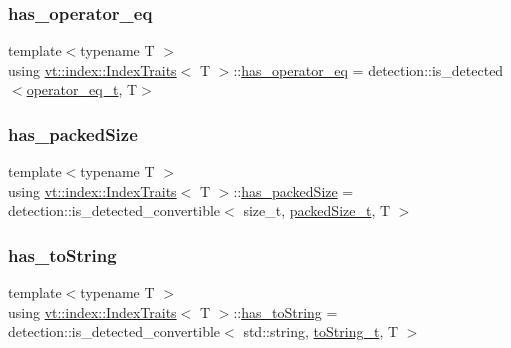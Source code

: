\subsubsection{\texorpdfstring{has\+\_\+operator\+\_\+eq}{has\_operator\_eq}}
{\footnotesize\ttfamily template$<$typename T $>$ \\
using \hyperlink{structvt_1_1index_1_1_index_traits}{vt\+::index\+::\+Index\+Traits}$<$ T $>$\+::\hyperlink{structvt_1_1index_1_1_index_traits_a93695cc99aee3cbdc63a3e2ab9b3f6be}{has\+\_\+operator\+\_\+eq} =  detection\+::is\+\_\+detected$<$\hyperlink{structvt_1_1index_1_1_index_traits_a23832f22385d2d20bb1fc9885aef6146}{operator\+\_\+eq\+\_\+t}, T$>$}

\mbox{\label{structvt_1_1index_1_1_index_traits_a257797ee702aa2108e9950f9aba373a4}} 
\subsubsection{\texorpdfstring{has\+\_\+packed\+Size}{has\_packedSize}}
{\footnotesize\ttfamily template$<$typename T $>$ \\
using \hyperlink{structvt_1_1index_1_1_index_traits}{vt\+::index\+::\+Index\+Traits}$<$ T $>$\+::\hyperlink{structvt_1_1index_1_1_index_traits_a257797ee702aa2108e9950f9aba373a4}{has\+\_\+packed\+Size} =  detection\+::is\+\_\+detected\+\_\+convertible$<$ size\+\_\+t, \hyperlink{structvt_1_1index_1_1_index_traits_a6d511f10a88cd9fb5b4d832127ce5044}{packed\+Size\+\_\+t}, T $>$}

\mbox{\label{structvt_1_1index_1_1_index_traits_ae91e2c26896622d9eab9416b4141042f}} 
\subsubsection{\texorpdfstring{has\+\_\+to\+String}{has\_toString}}
{\footnotesize\ttfamily template$<$typename T $>$ \\
using \hyperlink{structvt_1_1index_1_1_index_traits}{vt\+::index\+::\+Index\+Traits}$<$ T $>$\+::\hyperlink{structvt_1_1index_1_1_index_traits_ae91e2c26896622d9eab9416b4141042f}{has\+\_\+to\+String} =  detection\+::is\+\_\+detected\+\_\+convertible$<$ std\+::string, \hyperlink{structvt_1_1index_1_1_index_traits_afd3d724feb07329acc70afc067320558}{to\+String\+\_\+t}, T $>$}

